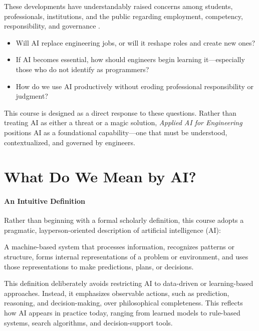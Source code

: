 \documentclass[12pt]{article}
\begin{document}
These developments have understandably raised concerns among students, professionals, institutions, and the public regarding employment, competency, responsibility, and governance \cite{wef_future_of_jobs_2025,ilo_generative_ai_jobs_2025,nasem_ai_future_of_work_2025,unesco_ai_competency_students_2024,nist_ai_rmf_genai_profile_2024}.

\begin{itemize}
\item Will AI replace engineering jobs, or will it reshape roles and create new ones?
\item If AI becomes essential, how should engineers begin learning it—especially those who do not identify as programmers?
\item How do we use AI productively without eroding professional responsibility or judgment?
\end{itemize}

This course is designed as a direct response to these questions. Rather than treating AI as either a threat or a magic solution, \emph{Applied AI for Engineering} positions AI as a foundational capability—one that must be understood, contextualized, and governed by engineers.


\section*{What Do We Mean by AI?}

\paragraph{An Intuitive Definition}

Rather than beginning with a formal scholarly definition, this course adopts a pragmatic, layperson-oriented description of artificial intelligence (AI):

\begin{def-box}
A machine-based system that processes information, recognizes patterns or structure, forms internal representations of a problem or environment, and uses those representations to make predictions, plans, or decisions.
\end{def-box}

This definition deliberately avoids restricting AI to data-driven or learning-based approaches. Instead, it emphasizes observable actions, such as prediction, reasoning, and decision-making, over philosophical completeness. This reflects how AI appears in practice today, ranging from learned models to rule-based systems, search algorithms, and decision-support tools.
\end{document}
